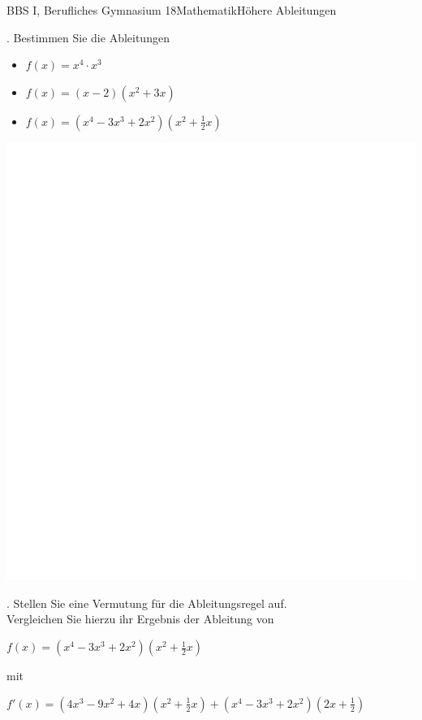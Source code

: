 \documentclass[oneside,openany,headings=optiontotoc,11pt,numbers=noenddot]{scrreprt}
\begin{document}
		\begin{worksheet}{BBS I, Berufliches Gymnasium 18}{Mathematik}{Höhere Ableitungen}
			\begin{framed}
				. Bestimmen Sie die Ableitungen
				\begin{itemize}[label=-]
					\item \(f(x) = x^4\cdot{}x^3\)
					\item \(f(x) = (x-2)(x^2+3x)\)
					\item \(f(x) = (x^4 - 3x^3 + 2x^2)(x^2 + \frac{1}{2}x)\)
				\end{itemize}
				\includegraphics[width=\textwidth]{../../empty.jpg}\\
				\par{}. Stellen Sie eine Vermutung für die Ableitungsregel auf.\\
				Vergleichen Sie hierzu ihr Ergebnis der Ableitung von\\
				\par\noindent
				\(f(x) = (x^4 - 3x^3 +2x^2)(x^2 + \frac{1}{2}x)\)\\
				\par\noindent
				mit\\
				\par\noindent
				\(f'(x) = (4x^3 - 9x^2 +4x)(x^2 + \frac{1}{2}x) + (x^4 - 3x^3 + 2x^2)(2x + \frac{1}{2})\)\\

\end{framed}
\end{worksheet}
\end{document}

